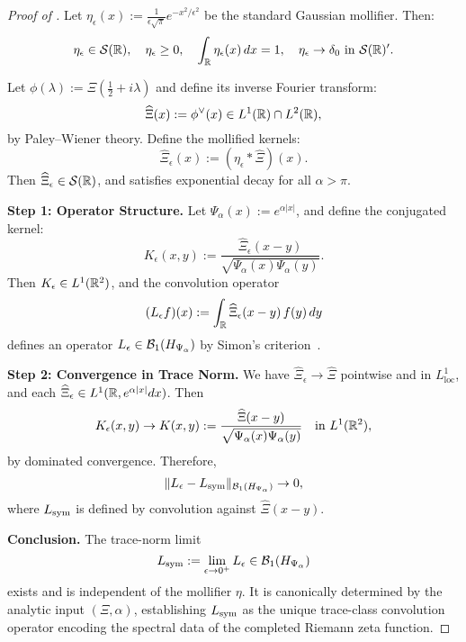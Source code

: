 \begin{proof}[Proof of ]
Let \( \eta_\epsilon(x) := \frac{1}{\epsilon \sqrt{\pi}} e^{-x^2 / \epsilon^2} \) be the standard Gaussian mollifier. Then:
\[
\eta_\epsilon \in \mathcal{S}(\mathbb{R}), \quad \eta_\epsilon \ge 0, \quad \int_{\mathbb{R}} \eta_\epsilon(x)\, dx = 1, \quad \eta_\epsilon \to \delta_0 \text{ in } \mathcal{S}(\mathbb{R})'.
\]

Let \( \phi(\lambda) := \Xi\left(\tfrac{1}{2} + i\lambda\right) \) and define its inverse Fourier transform:
\[
\widehat{\Xi}(x) := \phi^\vee(x) \in L^1(\mathbb{R}) \cap L^2(\mathbb{R}),
\]
by Paley--Wiener theory. Define the mollified kernels:
\[
\widehat{\Xi}_\epsilon(x) := (\eta_\epsilon * \widehat{\Xi})(x).
\]
Then \( \widehat{\Xi}_\epsilon \in \mathcal{S}(\mathbb{R}) \), and satisfies exponential decay for all \( \alpha > \pi \).

\smallskip
\noindent\textbf{Step 1: Operator Structure.}  
Let \( \Psi_\alpha(x) := e^{\alpha |x|} \), and define the conjugated kernel:
\[
K_\epsilon(x, y) := \frac{\widehat{\Xi}_\epsilon(x - y)}{\sqrt{\Psi_\alpha(x) \Psi_\alpha(y)}}.
\]
Then \( K_\epsilon \in L^1(\mathbb{R}^2) \), and the convolution operator
\[
(L_\epsilon f)(x) := \int_{\mathbb{R}} \widehat{\Xi}_\epsilon(x - y)\, f(y)\, dy
\]
defines an operator \( L_\epsilon \in \mathcal{B}_1(H_{\Psi_\alpha}) \) by Simon’s criterion~\cite[Thm.~3.1]{Simon2005TraceIdeals}.

\smallskip
\noindent\textbf{Step 2: Convergence in Trace Norm.}  
We have \( \widehat{\Xi}_\epsilon \to \widehat{\Xi} \) pointwise and in \( L^1_{\mathrm{loc}} \), and each \( \widehat{\Xi}_\epsilon \in L^1(\mathbb{R}, e^{\alpha |x|} dx) \). Then
\[
K_\epsilon(x, y) \to K(x, y) := \frac{\widehat{\Xi}(x - y)}{\sqrt{\Psi_\alpha(x) \Psi_\alpha(y)}} \quad \text{in } L^1(\mathbb{R}^2),
\]
by dominated convergence. Therefore,
\[
\| L_\epsilon - L_{\mathrm{sym}} \|_{\mathcal{B}_1(H_{\Psi_\alpha})} \to 0,
\]
where \( L_{\mathrm{sym}} \) is defined by convolution against \( \widehat{\Xi}(x - y) \).

\smallskip
\noindent\textbf{Conclusion.}  
The trace-norm limit
\[
L_{\mathrm{sym}} := \lim_{\epsilon \to 0^+} L_\epsilon \in \mathcal{B}_1(H_{\Psi_\alpha})
\]
exists and is independent of the mollifier \( \eta \). It is canonically determined by the analytic input \( (\Xi, \alpha) \), establishing \( L_{\mathrm{sym}} \) as the unique trace-class convolution operator encoding the spectral data of the completed Riemann zeta function.
\end{proof}
